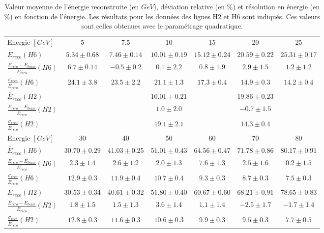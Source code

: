 \begin{table}[!ht]
  \begin{small}
    \begin{tabular}{l|c|c|c|c|c|c}
      \rowcolor{black!20!white}Energie $[GeV]$ & 5 & 7.5 & 10 & 15 & 20 & 25 \\
      \rowcolor{black!5!white} $\bar E_{reco}  (H6)$ & $5.34\pm0.68$ & $7.46\pm0.14$ & $10.01\pm0.19$ & $15.12\pm0.24$ & $20.59\pm0.22$ & $25.31\pm0.17$ \\ 
      \rowcolor{black!5!white} $\frac{\bar E_{reco}-E_{beam}}{\bar E_{reco}}  (H6)$ & $6.7\pm0.14$ & $-0.5\pm0.2$ & $0.1\pm2.2$ & $0.8\pm1.9$ & $2.9\pm1.5$ & $1.2\pm1.2$ \\ 
      \rowcolor{black!5!white} $\frac{\sigma_{reco}}{\bar E_{reco}}  (H6)$ & $24.1\pm3.8$ & $23.5\pm2.2$ & $21.1\pm1.3$ & $17.3\pm0.4$ & $14.9\pm0.3$ & $14.2\pm0.4$ \\ 
      \rowcolor{black!5!white}\hline
      \rowcolor{black!5!white} $\bar E_{reco}  (H2)$ &  &  & $10.01\pm0.21$ &  & $19.86\pm0.23$ &  \\ 
      \rowcolor{black!5!white} $\frac{\bar E_{reco}-E_{beam}}{\bar E_{reco}}  (H2)$ & & & $1.0\pm2.0$ &  & $-0.7\pm1.5$ &  \\ 
      \rowcolor{black!5!white} $\frac{\sigma_{reco}}{\bar E_{reco}}  (H2)$ & & & $19.1\pm2.1$ & & $14.3\pm0.4$ &  \\ 
      \rowcolor{black!20!white}Energie $[GeV]$ & 30 & 40 & 50 & 60 & 70 & 80 \\
      \rowcolor{black!5!white} $\bar E_{reco} (H6)$ & $30.70\pm0.29$ & $41.03\pm0.25$ & $51.01\pm0.43$ & $64.56\pm0.47$ & $71.78\pm0.86$ & $80.17\pm0.91$\\
      \rowcolor{black!5!white} $\frac{\bar E_{reco}-E_{beam}}{\bar E_{reco}}  (H6)$ & $2.3\pm1.4$ & $2.6\pm1.2$ & $2.0\pm1.3$ & $7.6\pm1.3$ & $2.5\pm1.6$ & $0.2\pm1.5$ \\ 
      \rowcolor{black!5!white} $\frac{\sigma_{reco}}{\bar E_{reco}}  (H6)$ & $12.9\pm0.3$ & $11.9\pm0.4$ & $10.7\pm0.4$ & $9.3\pm0.3$ & $8.7\pm0.3$ & $7.5\pm0.3$ \\ 
      \rowcolor{black!5!white}\hline
      \rowcolor{black!5!white} $\bar E_{reco} (H2)$ & $30.53\pm0.34$ & $40.61\pm0.32$ & $51.80\pm0.40$ & $60.67\pm0.60$ & $68.21\pm0.91$ & $78.65\pm0.83$\\
      \rowcolor{black!5!white} $\frac{\bar E_{reco}-E_{beam}}{\bar E_{reco}}  (H2)$ & $1.8\pm1.5$ & $1.5\pm1.3$ & $3.6\pm1.4$ & $1.1\pm1.4$ & $-2.5\pm1.7$ & $-1.7\pm1.4$ \\ 
      \rowcolor{black!5!white} $\frac{\sigma_{reco}}{\bar E_{reco}}  (H2)$ & $12.8\pm0.3$ & $11.6\pm0.3$ & $10.6\pm0.3$ & $9.9\pm0.3$ & $9.5\pm0.3$ & $7.7\pm0.5$ \\ 
    \end{tabular}
    \caption{Valeur moyenne de l'énergie reconstruite (en $GeV$), déviation relative (en $\%$) et résolution en énergie (en $\%$) en fonction de l'énergie. Les résultats pour les données des lignes H2 et H6 sont indiqués. Ces valeurs sont celles obtenues avec le paramétrage quadratique.}
    \label{tab.results}
  \end{small}
\end{table}

